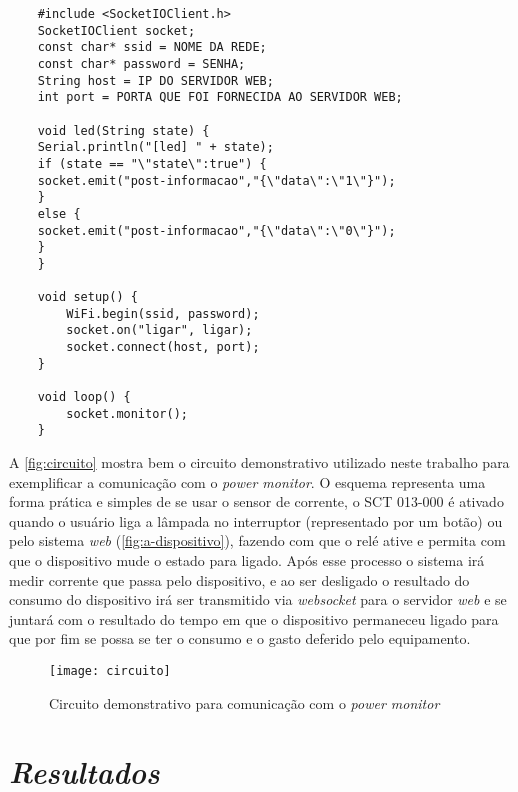 \addtocounter{footnote}{-2}
\addtocounter{footnote}{1}
\addtocounter{footnote}{1}

\begin{lstlisting}
	#include <SocketIOClient.h>
	SocketIOClient socket;
	const char* ssid = NOME DA REDE;
	const char* password = SENHA;
	String host = IP DO SERVIDOR WEB;
	int port = PORTA QUE FOI FORNECIDA AO SERVIDOR WEB;	

	void led(String state) {
	Serial.println("[led] " + state);
	if (state == "\"state\":true") {
	socket.emit("post-informacao","{\"data\":\"1\"}");
	}
	else {
	socket.emit("post-informacao","{\"data\":\"0\"}");
	}
	}

	void setup() {
		WiFi.begin(ssid, password);
  		socket.on("ligar", ligar);  
  		socket.connect(host, port);
	}

	void loop() {
  		socket.monitor();    
	}
\end{lstlisting}

A \autoref{fig:circuito} mostra bem o circuito demonstrativo utilizado neste trabalho para exemplificar a comunicação com o \textit{power monitor}.
O esquema representa uma forma prática e simples de se usar o sensor de corrente, o SCT 013-000 é ativado quando o usuário liga a lâmpada no interruptor
(representado por um botão) ou pelo sistema \textit{web} (\autoref{fig:a-dispositivo}), fazendo com que o relé ative e permita com que o dispositivo 
mude o estado para ligado. Após esse processo o sistema irá medir corrente que passa pelo dispositivo, e ao ser desligado o resultado
do consumo do dispositivo irá ser transmitido via \textit{websocket} para o servidor \textit{web} e se juntará com o resultado do tempo em que o dispositivo permaneceu
ligado para que por fim se possa se ter o consumo e o gasto deferido pelo equipamento. 

\begin{figure}[h!]
	\texttt{[image: circuito]}
	\centering
	\caption[Circuito demonstrativo para comunicação com o \textit{power monitor}]{Circuito demonstrativo para comunicação com o \textit{power monitor}}
	\label{fig:circuito}  
\end{figure}
\FloatBarrier

\section[\textit{Resultados}]{\textit{Resultados}}\label{resultados-sec}

